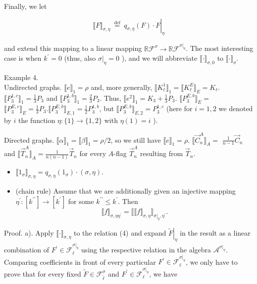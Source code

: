 \documentclass[10pt]{article}
\begin{document}
Finally, we let

$$
\left.\llbracket F \rrbracket_{\sigma, \eta} \stackrel{\text { def }}{=} q_{\sigma, \eta}(F) \cdot F\right|_{\eta}
$$

and extend this mapping to a linear mapping $\mathbb{R} \mathcal{F}^{\sigma} \longrightarrow \mathbb{R} \mathcal{F}^{\left.\sigma\right|_{\eta}}$. The most interesting case is when $k^{\prime}=0$ (thus, also $\left.\sigma\right|_{\eta}=0$ ), and we will abbreviate $\llbracket \cdot \rrbracket_{\sigma, 0}$ to $\llbracket \cdot \rrbracket_{\sigma}$.

Example 4.\\
Undirected graphs. $\llbracket e \rrbracket_{1}=\rho$ and, more generally, $\llbracket K_{\ell}^{1} \rrbracket_{1}=\llbracket K_{\ell}^{E} \rrbracket_{E}=K_{\ell}$. $\llbracket P_{3}^{1, c} \rrbracket_{1}=\frac{1}{3} P_{3}$ and $\llbracket P_{3}^{1, b} \rrbracket_{1}=\frac{2}{3} P_{3}$. Thus, $\llbracket e^{2} \rrbracket_{1}=K_{3}+\frac{1}{3} P_{3}$. $\llbracket P_{3}^{E, b} \rrbracket_{E}=$ $\llbracket P_{3}^{E, c} \rrbracket_{E}=\frac{1}{3} P_{3} . \llbracket P_{3}^{E, b} \rrbracket_{E, 1}=\frac{1}{2} P_{3}^{1, b}$, but $\llbracket P_{3}^{E, b} \rrbracket_{E, 2}=P_{3}^{1, c}$ (here for $i=1,2$ we denoted by $i$ the function $\eta:\{1\} \longrightarrow\{1,2\}$ with $\eta(1)=i$ ).

Directed graphs. $\llbracket \alpha \rrbracket_{1}=\llbracket \beta \rrbracket_{1}=\rho / 2$, so we still have $\llbracket e \rrbracket_{1}=\rho$. $\llbracket \vec{C}_{n}^{A} \rrbracket_{A}=$ $\frac{1}{n-1} \vec{C}_{n}$ and $\llbracket \vec{T}_{n}^{A} \rrbracket_{A}=\frac{1}{n(n-1)} \vec{T}_{n}$ for every $A$-flag $\vec{T}_{n}^{A}$ resulting from $\vec{T}_{n}$.

\begin{itemize}
  \item[b)] $\llbracket 1_{\sigma} \rrbracket_{\sigma, \eta}=q_{\sigma, \eta}\left(1_{\sigma}\right) \cdot(\sigma, \eta)$.
  \item[c)] (chain rule) Assume that we are additionally given an injective mapping $\eta^{\prime}:\left[k^{\prime \prime}\right] \longrightarrow\left[k^{\prime}\right]$ for some $k^{\prime \prime} \leq k^{\prime}$. Then
$$
\llbracket f \rrbracket_{\sigma, \eta \eta^{\prime}}=\llbracket \llbracket f \rrbracket_{\sigma, \eta} \rrbracket_{\left.\sigma\right|_{\eta}, \eta^{\prime}} .
$$
\end{itemize}

Proof. a). Apply $\llbracket \cdot \rrbracket_{\sigma, \eta}$ to the relation (4) and expand $\left.\widetilde{F}\right|_{\eta}$ in the result as a linear combination of $F^{\prime} \in \mathcal{F}_{\ell}^{\left.\sigma\right|_{\eta}}$ using the respective relation in the algebra $\mathcal{A}^{\left.\sigma\right|_{\eta}}$. Comparing coefficients in front of every particular $F^{\prime} \in \mathcal{F}_{\ell}^{\left.\sigma\right|_{\eta}}$, we only have to prove that for every fixed $\widetilde{F} \in \mathcal{F}_{\tilde{\ell}}^{\sigma}$ and $F^{\prime} \in \mathcal{F}_{\ell}^{\left.\sigma\right|_{\eta}}$, we have
\end{document}
